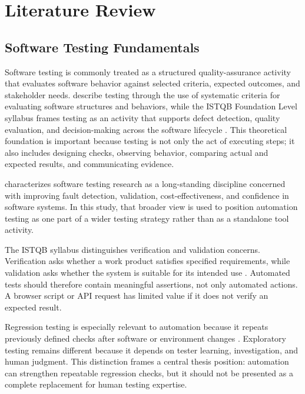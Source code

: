 \chapter{Literature Review}
\label{ch:literature-review}

\section{Software Testing Fundamentals}
\label{sec:ch2-software-testing-fundamentals}

Software testing is commonly treated as a structured quality-assurance activity that evaluates software behavior against selected criteria, expected outcomes, and stakeholder needs. \textcite{ammann_offutt_testing_2016} describe testing through the use of systematic criteria for evaluating software structures and behaviors, while the ISTQB Foundation Level syllabus frames testing as an activity that supports defect detection, quality evaluation, and decision-making across the software lifecycle \autocite{istqb_ctfl_syllabus_2024}. This theoretical foundation is important because testing is not only the act of executing steps; it also includes designing checks, observing behavior, comparing actual and expected results, and communicating evidence.

\textcite{bertolino_testing_research_2007} characterizes software testing research as a long-standing discipline concerned with improving fault detection, validation, cost-effectiveness, and confidence in software systems. In this study, that broader view is used to position automation testing as one part of a wider testing strategy rather than as a standalone tool activity.

The ISTQB syllabus distinguishes verification and validation concerns. Verification asks whether a work product satisfies specified requirements, while validation asks whether the system is suitable for its intended use \autocite{istqb_ctfl_syllabus_2024}. Automated tests should therefore contain meaningful assertions, not only automated actions. A browser script or API request has limited value if it does not verify an expected result.

Regression testing is especially relevant to automation because it repeats previously defined checks after software or environment changes \autocite{istqb_ctfl_syllabus_2024}. Exploratory testing remains different because it depends on tester learning, investigation, and human judgment. This distinction frames a central thesis position: automation can strengthen repeatable regression checks, but it should not be presented as a complete replacement for human testing expertise.

